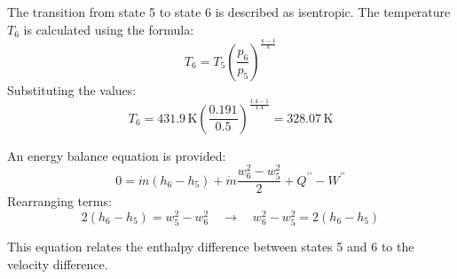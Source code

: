 The transition from state 5 to state 6 is described as isentropic. The temperature \( T_6 \) is calculated using the formula:  
\[
T_6 = T_5 \left( \frac{p_6}{p_5} \right)^{\frac{\kappa - 1}{\kappa}}
\]  
Substituting the values:  
\[
T_6 = 431.9 \, \text{K} \left( \frac{0.191}{0.5} \right)^{\frac{1.4 - 1}{1.4}} = 328.07 \, \text{K}
\]  

An energy balance equation is provided:  
\[
0 = \dot{m} (h_6 - h_5) + \dot{m} \frac{w_6^2 - w_5^2}{2} + Q^{\prime\prime} - W^{\prime\prime}
\]  
Rearranging terms:  
\[
2 (h_6 - h_5) = w_5^2 - w_6^2 \quad \rightarrow \quad w_6^2 - w_5^2 = 2 (h_6 - h_5)
\]  

This equation relates the enthalpy difference between states 5 and 6 to the velocity difference.